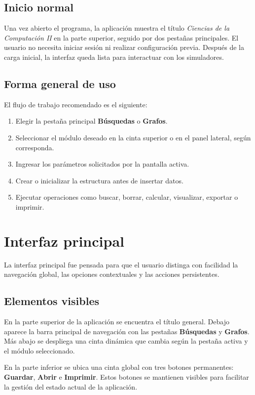 \documentclass[10pt,onecolumn]{IEEEtran}
\begin{document}
\subsection{Inicio normal}
Una vez abierto el programa, la aplicación muestra el título \textit{Ciencias de la Computación II} en la parte superior, seguido por dos pestañas principales. El usuario no necesita iniciar sesión ni realizar configuración previa. Después de la carga inicial, la interfaz queda lista para interactuar con los simuladores.

\subsection{Forma general de uso}
El flujo de trabajo recomendado es el siguiente:
\begin{enumerate}
  \item Elegir la pestaña principal \textbf{Búsquedas} o \textbf{Grafos}.
  \item Seleccionar el módulo deseado en la cinta superior o en el panel lateral, según corresponda.
  \item Ingresar los parámetros solicitados por la pantalla activa.
  \item Crear o inicializar la estructura antes de insertar datos.
  \item Ejecutar operaciones como buscar, borrar, calcular, visualizar, exportar o imprimir.
\end{enumerate}

\section{Interfaz principal}
La interfaz principal fue pensada para que el usuario distinga con facilidad la navegación global, las opciones contextuales y las acciones persistentes.

\subsection{Elementos visibles}
En la parte superior de la aplicación se encuentra el título general. Debajo aparece la barra principal de navegación con las pestañas \textbf{Búsquedas} y \textbf{Grafos}. Más abajo se despliega una cinta dinámica que cambia según la pestaña activa y el módulo seleccionado.

En la parte inferior se ubica una cinta global con tres botones permanentes:
\textbf{Guardar}, \textbf{Abrir} e \textbf{Imprimir}. Estos botones se mantienen visibles para facilitar la gestión del estado actual de la aplicación.
\end{document}
